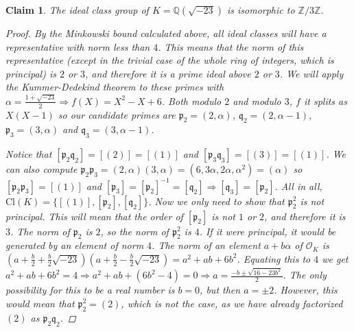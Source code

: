 \documentclass[11pt]{article}
\newtheorem{claim}[theorem]{Claim}
\theoremstyle{definition}
\begin{document}
    \begin{claim}
        The ideal class group of $K = \mathbb{Q}\left(\sqrt {-23}\right)$ is isomorphic to $\mathbb{Z}/3\mathbb{Z}$.

        \begin{proof}
            By the Minkowski bound calculated above, all ideal classes will have a representative with norm less than $4$.
            This means that the norm of this representative (except in the trivial case of the whole ring of integers, which is principal) is
            $2$ or $3$, and therefore it is a prime ideal above $2$ or $3$.
            We will apply the Kummer-Dedekind theorem to these primes with $\alpha = \frac{1+\sqrt {-23}}{2} \Rightarrow f(X) = X^2 - X + 6$.
            Both modulo $2$ and modulo $3$, $f$ it splits as $X(X-1)$ so our candidate primes are $\mathfrak{p}_2 = (2, \alpha)$, $\mathfrak{q}_2 = (2, \alpha - 1)$,
            $\mathfrak{p}_3 = (3, \alpha)$ and $\mathfrak{q}_3 = (3, \alpha - 1)$.\linebreak

            \noindent Notice that $[\mathfrak{p}_2 \mathfrak{q}_2] = [(2)] = [(1)]$ and $[\mathfrak{p}_3 \mathfrak{q}_3] = [(3)] = [(1)]$.
            We can also compute $\mathfrak{p}_2\mathfrak{p}_3 = (2, \alpha)(3, \alpha) = (6, 3\alpha, 2\alpha, \alpha^2) = (\alpha)$
            so $[\mathfrak{p}_2\mathfrak{p}_3] = [(1)]$ and
            $[\mathfrak{p}_3] = [\mathfrak{p}_2]^{-1} = [\mathfrak{q}_2] \Rightarrow [\mathfrak{q}_3] = [\mathfrak{p_2}]$.
            All in all, $\text{Cl}(K) = \{[(1)], [\mathfrak{p}_2], [\mathfrak{q}_2]\}$.
            Now we only need to show that $\mathfrak{p}_2^2$ is not principal.
            This will mean that the order of $[\mathfrak{p}_2]$ is not $1$ or $2$, and therefore it is $3$.
            The norm of $\mathfrak{p}_2$ is $2$, so the norm of $\mathfrak{p}_2^2$ is $4$.
            If it were principal, it would be generated by an element of norm $4$.
            The norm of an element $a + b \alpha$ of $\mathcal{O}_K$ is
            $\left(a + \frac{b}{2} + \frac{b}{2}\sqrt{-23}\right)\left(a + \frac{b}{2} - \frac{b}{2}\sqrt{-23}\right) = a^2 + ab + 6b^2$.
            Equating this to $4$ we get $a^2 + ab + 6b^2 = 4 \Rightarrow a^2 + ab + (6b^2 - 4) = 0 \Rightarrow a = \frac{-b \pm \sqrt{16 - 23b^2}}{2}$.
            The only possibility for this to be a real number is $b = 0$, but then $a = \pm 2$.
            However, this would mean that $\mathfrak{p}_2^2 = (2)$, which is not the case, as we have already factorized $(2)$ as $\mathfrak{p}_2\mathfrak{q}_2$.

        \end{proof}

    \end{claim}
\end{document}
